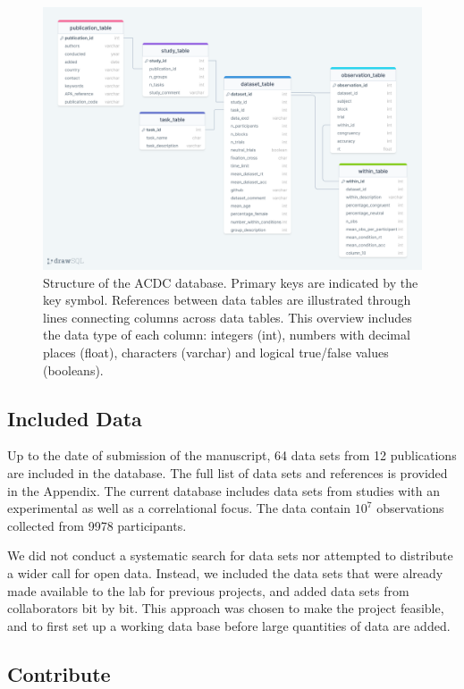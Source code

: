 \documentclass[
  man,floatsintext]{apa6}
\begin{document}
\begin{figure}
\centering
\includegraphics{images/db_structure.png}
\caption{\label{fig:figure2}Structure of the ACDC database. Primary keys are indicated by the key symbol. References between data tables are illustrated through lines connecting columns across data tables. This overview includes the data type of each column: integers (int), numbers with decimal places (float), characters (varchar) and logical true/false values (booleans).}
\end{figure}

\hypertarget{included-data}{%
\subsection{Included Data}\label{included-data}}

Up to the date of submission of the manuscript, 64 data sets from 12 publications are included in the database. The full list of data sets and references is provided in the Appendix. The current database includes data sets from studies with an experimental as well as a correlational focus. The data contain \(10^ 7\) observations collected from 9978 participants.

We did not conduct a systematic search for data sets nor attempted to distribute a wider call for open data. Instead, we included the data sets that were already made available to the lab for previous projects, and added data sets from collaborators bit by bit. This approach was chosen to make the project feasible, and to first set up a working data base before large quantities of data are added.

\hypertarget{contribute}{%
\subsection{Contribute}\label{contribute}}
\end{document}
